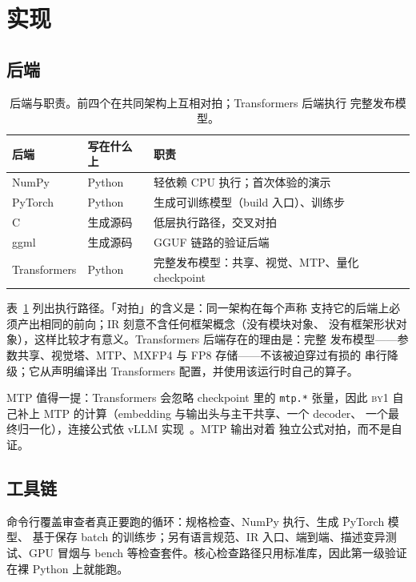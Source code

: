 \documentclass[11pt,a4paper]{ctexart}
\newcommand{\code}[1]{\texttt{#1}}
\newcommand{\byone}{\textsc{by1}}
\newcommand{\q}[1]{「#1」}
\begin{document}
\section{实现}
\label{sec:impl}

\subsection{后端}

\begin{table}[t]
\centering\small
\caption{后端与职责。前四个在共同架构上互相对拍；Transformers 后端执行
完整发布模型。}
\label{tab:backends}
\begin{tabular}{@{}p{2.4cm}p{2.4cm}p{7.2cm}@{}}
\toprule
后端 & 写在什么上 & 职责 \\
\midrule
NumPy & Python & 轻依赖 CPU 执行；首次体验的演示 \\
PyTorch & Python & 生成可训练模型（build 入口）、训练步 \\
C & 生成源码 & 低层执行路径，交叉对拍 \\
ggml & 生成源码 & GGUF 链路的验证后端 \\
Transformers & Python & 完整发布模型：共享、视觉、MTP、量化 checkpoint \\
\bottomrule
\end{tabular}
\end{table}

表~\ref{tab:backends} 列出执行路径。\q{对拍}的含义是：同一架构在每个声称
支持它的后端上必须产出相同的前向；IR 刻意不含任何框架概念（没有模块对象、
没有框架形状对象），这样比较才有意义。Transformers 后端存在的理由是：完整
发布模型——参数共享、视觉塔、MTP、MXFP4 与 FP8 存储——不该被迫穿过有损的
串行降级；它从声明编译出 Transformers 配置，并使用该运行时自己的算子。

MTP 值得一提：Transformers 会忽略 checkpoint 里的 \code{mtp.*} 张量，因此
\byone{} 自己补上 MTP 的计算（embedding 与输出头与主干共享、一个 decoder、
一个最终归一化），连接公式依 vLLM 实现~\cite{kwon2023vllm}。MTP 输出对着
独立公式对拍，而不是自证。

\subsection{工具链}

命令行覆盖审查者真正要跑的循环：规格检查、NumPy 执行、生成 PyTorch 模型、
基于保存 batch 的训练步；另有语言规范、IR 入口、端到端、描述变异测试、GPU
冒烟与 bench 等检查套件。核心检查路径只用标准库，因此第一级验证在裸 Python
上就能跑。
\end{document}
